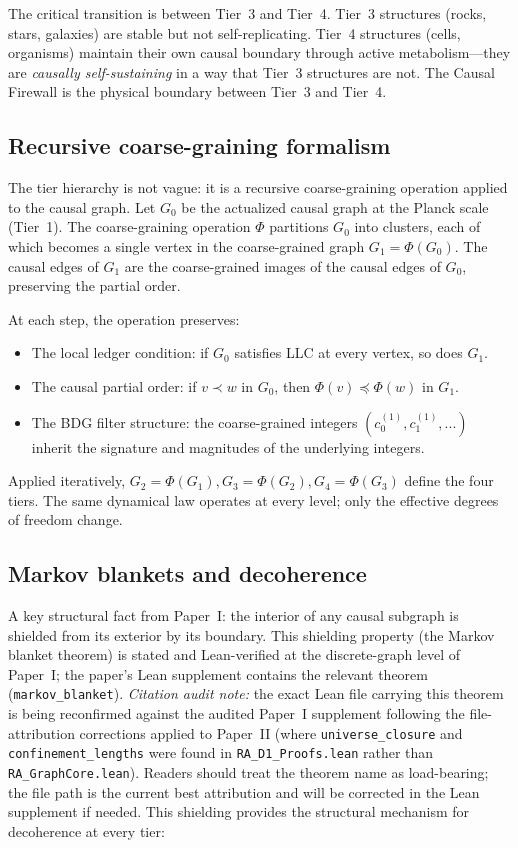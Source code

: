 \documentclass[11pt]{article}
\def\ldots{...}%
\begin{document}
The critical transition is between Tier~3 and Tier~4. Tier~3 structures (rocks, stars, galaxies) are stable but not self-replicating. Tier~4 structures (cells, organisms) maintain their own causal boundary through active metabolism---they are \emph{causally self-sustaining} in a way that Tier~3 structures are not. The Causal Firewall is the physical boundary between Tier~3 and Tier~4.

\subsection{Recursive coarse-graining formalism}
\label{sec:coarse_grain}

The tier hierarchy is not vague: it is a recursive coarse-graining operation applied to the causal graph. Let $G_0$ be the actualized causal graph at the Planck scale (Tier~1). The coarse-graining operation $\Phi$ partitions $G_0$ into clusters, each of which becomes a single vertex in the coarse-grained graph $G_1 = \Phi(G_0)$. The causal edges of $G_1$ are the coarse-grained images of the causal edges of $G_0$, preserving the partial order.

At each step, the operation preserves:
\begin{itemize}[nosep]
\item The local ledger condition: if $G_0$ satisfies LLC at every vertex, so does $G_1$.
\item The causal partial order: if $v \prec w$ in $G_0$, then $\Phi(v) \preceq \Phi(w)$ in $G_1$.
\item The BDG filter structure: the coarse-grained integers $(c_0^{(1)}, c_1^{(1)}, \ldots)$ inherit the signature and magnitudes of the underlying integers.
\end{itemize}

Applied iteratively, $G_2 = \Phi(G_1), G_3 = \Phi(G_2), G_4 = \Phi(G_3)$ define the four tiers. The same dynamical law operates at every level; only the effective degrees of freedom change.

\subsection{Markov blankets and decoherence}
\label{sec:markov_blanket}

A key structural fact from Paper~I: the interior of any causal subgraph is shielded from its exterior by its boundary. This shielding property (the Markov blanket theorem) is stated and Lean-verified at the discrete-graph level of Paper~I; the paper's Lean supplement contains the relevant theorem (\texttt{markov\_blanket}). \emph{Citation audit note:} the exact Lean file carrying this theorem is being reconfirmed against the audited Paper~I supplement following the file-attribution corrections applied to Paper~II (where \texttt{universe\_closure} and \texttt{confinement\_lengths} were found in \texttt{RA\_D1\_Proofs.lean} rather than \texttt{RA\_GraphCore.lean}). Readers should treat the theorem name as load-bearing; the file path is the current best attribution and will be corrected in the Lean supplement if needed. This shielding provides the structural mechanism for decoherence at every tier:
\end{document}
